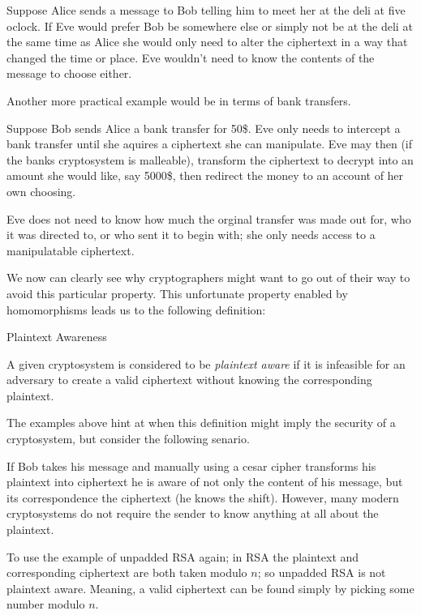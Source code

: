 \begin{exmp}
    Suppose Alice sends a message to Bob telling him to meet her at the deli at five oclock. If Eve would prefer Bob be somewhere else or simply not be at the deli at the same time as Alice she would only need to alter the ciphertext in a way that changed the time or place. Eve wouldn't need to know the contents of the message to choose either.
\end{exmp}

Another more practical example would be in terms of bank transfers.

\begin{exmp}
    Suppose Bob sends Alice a bank transfer for 50\$. 
    Eve only needs to intercept a bank transfer until she aquires a ciphertext she can manipulate. 
    Eve may then (if the banks cryptosystem is malleable), transform the ciphertext to decrypt into an amount she would like, say 5000\$, then redirect the money to an account of her own choosing. 
    
    Eve does not need to know how much the orginal transfer was made out for, who it was directed to, or who sent it to begin with; she only needs access to a manipulatable ciphertext.
\end{exmp}

We now can clearly see why cryptographers might want to go out of their way to avoid this particular property. This unfortunate property enabled by homomorphisms leads us to the following definition:

\begin{defn}{Plaintext Awareness}
    
    A given cryptosystem is considered to be \emph{plaintext aware} if it is infeasible for an adversary to create a valid ciphertext without knowing the corresponding plaintext. \cite{Bel1995}
\end{defn}

The examples above hint at when this definition might imply the security of a cryptosystem, but consider the following senario. 

If Bob takes his message and manually using a cesar cipher transforms his plaintext into ciphertext he is aware of not only the content of his message, but its correspondence the ciphertext (he knows the shift). However, many modern cryptosystems do not require the sender to know anything at all about the plaintext.

To use the example of unpadded RSA again; in RSA the plaintext and corresponding ciphertext are both taken modulo $n$; so unpadded RSA is not plaintext aware. Meaning, a valid ciphertext can be found simply by picking some number modulo $n$. 


